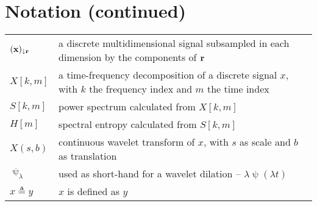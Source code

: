 \section*{Notation (continued)}
\begin{tabular}{p{} p{}}
    $(\boldsymbol{\mathbf{x}})_{\downarrow \boldsymbol{\mathbf{r}}}$ & a discrete multidimensional signal subsampled in each dimension by the components of $\boldsymbol{\mathbf{r}}$ \\
    $X[k,m]$ & a time-frequency decomposition of a discrete signal $x$, with $k$ the frequency index and $m$ the time index \\
    $S[k,m]$ & power spectrum calculated from $X[k, m]$ \\
    $H[m]$ & spectral entropy calculated from $S[k, m]$ \\
    $X(s, b)$ & continuous wavelet transform of $x$, with $s$ as scale and $b$ as translation \\
    $\uppsi_\lambda$ & used as short-hand for a wavelet dilation -- $\lambda\uppsi(\lambda t)$\\
    $x \triangleq y$ & $x$ is defined as $y$\\
\end{tabular}


